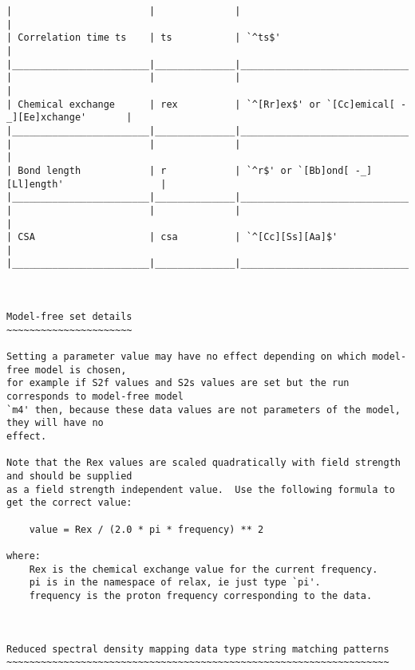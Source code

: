 {\begin{verbatim}
|                        |              |                                                  |
| Correlation time ts    | ts           | `^ts$'                                           |
|________________________|______________|__________________________________________________|
|                        |              |                                                  |
| Chemical exchange      | rex          | `^[Rr]ex$' or `[Cc]emical[ -_][Ee]xchange'       |
|________________________|______________|__________________________________________________|
|                        |              |                                                  |
| Bond length            | r            | `^r$' or `[Bb]ond[ -_][Ll]ength'                 |
|________________________|______________|__________________________________________________|
|                        |              |                                                  |
| CSA                    | csa          | `^[Cc][Ss][Aa]$'                                 |
|________________________|______________|__________________________________________________|



Model-free set details
~~~~~~~~~~~~~~~~~~~~~~

Setting a parameter value may have no effect depending on which model-free model is chosen,
for example if S2f values and S2s values are set but the run corresponds to model-free model
`m4' then, because these data values are not parameters of the model, they will have no
effect.

Note that the Rex values are scaled quadratically with field strength and should be supplied
as a field strength independent value.  Use the following formula to get the correct value:

    value = Rex / (2.0 * pi * frequency) ** 2

where:
    Rex is the chemical exchange value for the current frequency.
    pi is in the namespace of relax, ie just type `pi'.
    frequency is the proton frequency corresponding to the data.



Reduced spectral density mapping data type string matching patterns
~~~~~~~~~~~~~~~~~~~~~~~~~~~~~~~~~~~~~~~~~~~~~~~~~~~~~~~~~~~~~~~~~~~


\end{verbatim}}
